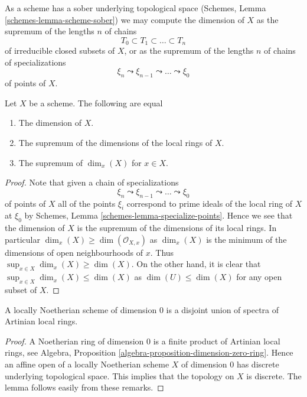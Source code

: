 \noindent
As a scheme has a sober underlying topological space
(Schemes, Lemma \ref{schemes-lemma-scheme-sober})
we may compute the dimension of $X$ as the supremum of the lengths $n$
of chains
$$
T_0 \subset T_1 \subset \ldots \subset T_n
$$
of irreducible closed subsets of $X$, or as the supremum of the lengths $n$
of chains of specializations
$$
\xi_n \leadsto \xi_{n - 1} \leadsto \ldots \leadsto \xi_0
$$
of points of $X$.

\begin{lemma}
\label{lemma-dimension}
Let $X$ be a scheme. The following are equal
\begin{enumerate}
\item The dimension of $X$.
\item The supremum of the dimensions of the local rings of $X$.
\item The supremum of $\dim_x(X)$ for $x \in X$.
\end{enumerate}
\end{lemma}

\begin{proof}
Note that given a chain of specializations
$$
\xi_n \leadsto \xi_{n - 1} \leadsto \ldots \leadsto \xi_0
$$
of points of $X$ all of the points $\xi_i$ correspond to prime ideals
of the local ring of $X$ at $\xi_0$ by
Schemes, Lemma \ref{schemes-lemma-specialize-points}.
Hence we see that the dimension of $X$ is the supremum of the dimensions
of its local rings. In particular $\dim_x(X) \geq \dim(\mathcal{O}_{X, x})$
as $\dim_x(X)$ is the minimum of the dimensions of open neighbourhoods of
$x$. Thus $\sup_{x \in X} \dim_x(X) \geq \dim(X)$. On the other hand,
it is clear that $\sup_{x \in X} \dim_x(X) \leq \dim(X)$
as $\dim(U) \leq \dim(X)$ for any open subset of $X$.
\end{proof}

\begin{lemma}
\label{lemma-locally-Noetherian-dimension-0}
A locally Noetherian scheme of dimension $0$ is a disjoint
union of spectra of Artinian local rings.
\end{lemma}

\begin{proof}
A Noetherian ring of dimension $0$ is a finite product of Artinian local
rings, see
Algebra, Proposition \ref{algebra-proposition-dimension-zero-ring}.
Hence an affine open of a locally Noetherian scheme $X$ of dimension
$0$ has discrete underlying topological space. This implies that
the topology on $X$ is discrete. The lemma follows easily from these
remarks.
\end{proof}




